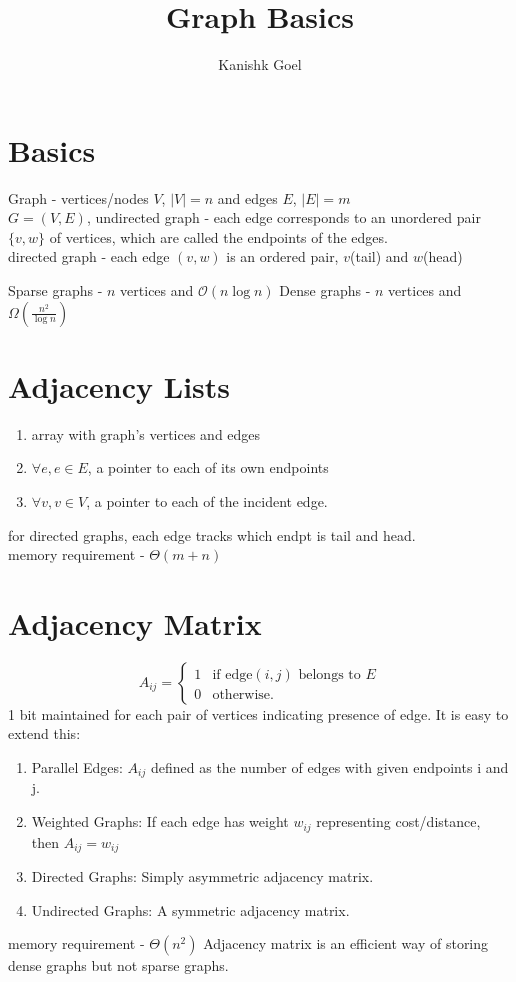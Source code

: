 \documentclass{article}
\title{Graph Basics}
\author{Kanishk Goel}
\begin{document}
	\SetAlgoCaptionSeparator{}
	\renewcommand{\thealgocf}{} 
	\renewcommand{\AlCapNameFnt}{\bfseries}
	\renewcommand{\AlCapFnt}{}
	\DontPrintSemicolon
	\renewcommand{\algorithmcfname}{}
	\maketitle
	\SetAlgoNoEnd
	\section{Basics}
	Graph - vertices/nodes $V$, $|V| = n$ and edges $E$, $|E| = m$ \\ $G = (V,E)$, undirected graph - each edge corresponds to an unordered pair $\{v,w\}$ of vertices, which are called the endpoints of the edges. \\
	directed graph - each edge $(v,w)$ is an ordered pair, $v$(tail) and $w$(head)
	
	Sparse graphs - $n$ vertices and $\mathcal{O}(n \log n)$
	Dense graphs - $n$ vertices and $\Omega(\frac{n^2}{\log n})$
	\section{Adjacency Lists}
	\begin{enumerate}
		\item array with graph's vertices and edges
		\item $\forall e, e \in E$, a pointer to each of its own endpoints
		\item $\forall v, v \in V$, a pointer to each of the incident edge.
	\end{enumerate}
	for directed graphs, each edge tracks which endpt is tail and head. \\ memory requirement - $\Theta(m+n)$
	\section{Adjacency Matrix}
	$$A_{ij} = 
	\begin{cases}
	1 & \text{if edge} (i,j) \text{ belongs to } E \\
	0 & \text{otherwise.}
	\end{cases}
	$$
	1 bit maintained for each pair of vertices indicating presence of edge.
	It is easy to extend this:
	\begin{enumerate}
		\item Parallel Edges: $A_{ij}$ defined as the number of edges with given endpoints i and j.
		\item Weighted Graphs: If each edge has weight $w_{ij}$ representing cost/distance, then $A_{ij} = w_{ij}$
		\item Directed Graphs: Simply asymmetric adjacency matrix.
		\item Undirected Graphs: A symmetric adjacency matrix.
	\end{enumerate}
	memory requirement - $\Theta(n^2)$
	Adjacency matrix is an efficient way of storing dense graphs but not sparse graphs.
\end{document}
